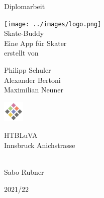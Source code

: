 \begin{titlepage}
	\begin{center}
		\Large{Diplomarbeit} \\

		\bigskip
		\bigskip
		\bigskip

		\texttt{[image: ../images/logo.png]} \\
		\Huge{Skate-Buddy} \\
		\bigskip
		\bigskip
		\bigskip
		\huge{Eine App für Skater} \\

		\bigskip
		\bigskip
		\bigskip
		\large{erstellt von} \\

		\bigskip
		\bigskip
		\bigskip

		\Huge{Philipp Schuler} \\
		\Huge{Alexander Bertoni} \\
		\Huge{Maximilian Neuner} \\
		\bigskip
		\bigskip
		\bigskip


		\bigskip
		\bigskip

		\includegraphics[width=1cm]{../images/htl-logo}

		\Large{HTBLuVA} \\
		\Large{Innsbruck Anichstrasse} \\

		\bigskip
		\bigskip
		\bigskip

		 \\
		Sabo Rubner

		\bigskip
		\bigskip
		\bigskip
		\bigskip

		\Large{2021/22}

	\end{center}

\end{titlepage}